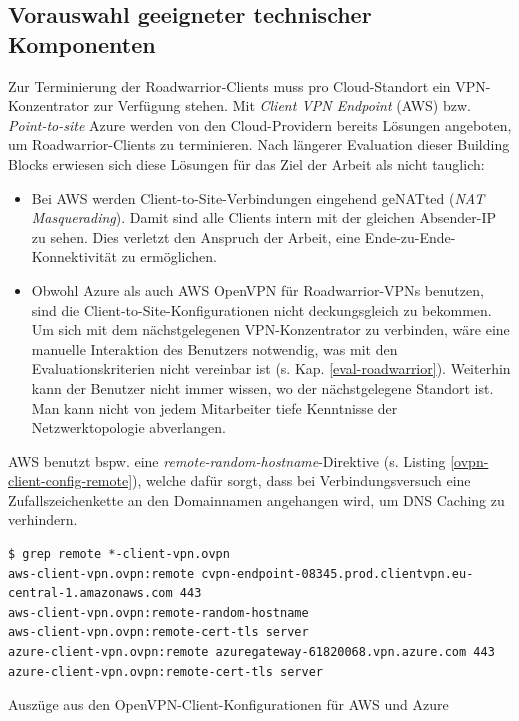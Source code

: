 \subsection{Vorauswahl geeigneter technischer Komponenten}\label{uc1-vorauswahl}
Zur Terminierung der \gls{Roadwarrior}-\gls{Client}s muss pro Cloud-Standort ein \gls{VPN-Konzentrator} zur Verfügung stehen. Mit \textit{\gls{Client} \gls{VPN} Endpoint} (AWS) bzw. \textit{Point-to-site} Azure werden von den Cloud-Providern bereits Lösungen angeboten, um \gls{Roadwarrior}-\gls{Client}s zu terminieren. Nach längerer Evaluation dieser Building Blocks erwiesen sich diese Lösungen für das Ziel der Arbeit als nicht tauglich:
\begin{itemize}
\item Bei AWS werden \gls{Client-to-Site}-Verbindungen eingehend ge\gls{NAT}ted (\textit{NAT Masquerading}). Damit sind alle \gls{Client}s intern mit der gleichen Absender-IP zu sehen. Dies verletzt den Anspruch der Arbeit, eine Ende-zu-Ende-Konnektivität zu ermöglichen.
\item Obwohl Azure als auch AWS OpenVPN für \gls{Roadwarrior}-\gls{VPN}s benutzen, sind die \gls{Client-to-Site}-Konfigurationen nicht \glqq deckungsgleich\grqq{} zu bekommen. Um sich mit dem nächstgelegenen \gls{VPN-Konzentrator} zu verbinden, wäre eine manuelle Interaktion des Benutzers notwendig, was mit den Evaluationskriterien nicht vereinbar ist (s. Kap. \ref{eval-roadwarrior}). Weiterhin kann der Benutzer nicht immer wissen, wo der nächstgelegene Standort ist. Man kann nicht von jedem Mitarbeiter tiefe Kenntnisse der Netzwerktopologie abverlangen.
\end{itemize}
AWS benutzt bspw. eine \textit{remote-random-hostname}-Direktive (s. Listing \ref{ovpn-client-config-remote}), welche dafür sorgt, dass bei Verbindungsversuch eine Zufallszeichenkette an den Domainnamen angehangen wird, um \gls{DNS} Caching zu verhindern.
\begin{listing}[h]
\begin{verbatim}
$ grep remote *-client-vpn.ovpn
aws-client-vpn.ovpn:remote cvpn-endpoint-08345.prod.clientvpn.eu-central-1.amazonaws.com 443
aws-client-vpn.ovpn:remote-random-hostname
aws-client-vpn.ovpn:remote-cert-tls server
azure-client-vpn.ovpn:remote azuregateway-61820068.vpn.azure.com 443
azure-client-vpn.ovpn:remote-cert-tls server

\end{verbatim}
\caption{Auszüge aus den OpenVPN-Client-Konfigurationen für AWS und Azure}
\label{ovpn-client-config-remote}
\end{listing}\FloatBarrier
